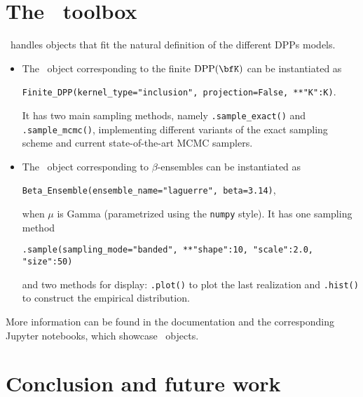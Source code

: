 \documentclass[twoside,11pt]{article}
\begin{document}



\section{The \DPPy\ toolbox} %
\label{sec:the_dppy_toolbox}

  \DPPy\ handles objects that fit the natural definition of the different DPPs models.
  \begin{itemize}
	  \item The \DPPy\ object corresponding to the finite $\DPP(\bfK)$ can be instantiated as
	  \begin{nscenter}
	  	\texttt{Finite_DPP(kernel_type="inclusion", projection=False, **{"K":K})}.
	  \end{nscenter}
		It has two main sampling methods, namely \texttt{.sample_exact()} and \texttt{.sample_mcmc()}, implementing different variants of the exact sampling scheme and current state-of-the-art MCMC samplers.

		\item The \DPPy\ object corresponding to $\beta$-ensembles can be instantiated as
		\begin{nscenter}
			\texttt{Beta_Ensemble(ensemble_name="laguerre", beta=3.14)},
		\end{nscenter}
		when $\mu$ is Gamma (parametrized using the \texttt{numpy} style).
		It has one sampling method
		\begin{nscenter}
			\texttt{.sample(sampling_mode="banded", **{"shape":10, "scale":2.0, "size":50})}
		\end{nscenter}
		and two methods for display: \texttt{.plot()} to plot the last realization and \texttt{.hist()} to construct the empirical distribution.
  \end{itemize}

  More information can be found in the documentation and the corresponding Jupyter notebooks, which showcase \DPPy\ objects.


\section{Conclusion and future work} %
\label{sec:conclusion_and_future_work}
\end{document}
